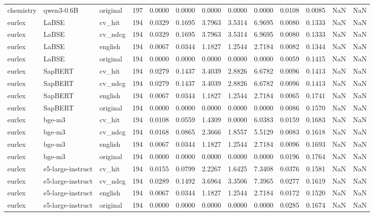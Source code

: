 \begin{tabular}{lllrrrrrrrrrr}
chemistry & qwen3-0.6B & original & 197 & 0.0000 & 0.0000 & 0.0000 & 0.0000 & 0.0000 & 0.0108 & 0.0085 & NaN & NaN \\
eurlex & LaBSE & cv\_hit & 194 & 0.0329 & 0.1695 & 3.7963 & 3.5314 & 6.9695 & 0.0080 & 0.1333 & NaN & NaN \\
eurlex & LaBSE & cv\_ndcg & 194 & 0.0329 & 0.1695 & 3.7963 & 3.5314 & 6.9695 & 0.0080 & 0.1333 & NaN & NaN \\
eurlex & LaBSE & english & 194 & 0.0067 & 0.0344 & 1.1827 & 1.2544 & 2.7184 & 0.0082 & 0.1344 & NaN & NaN \\
eurlex & LaBSE & original & 194 & 0.0000 & 0.0000 & 0.0000 & 0.0000 & 0.0000 & 0.0059 & 0.1415 & NaN & NaN \\
eurlex & SapBERT & cv\_hit & 194 & 0.0279 & 0.1437 & 3.4039 & 2.8826 & 6.6782 & 0.0096 & 0.1413 & NaN & NaN \\
eurlex & SapBERT & cv\_ndcg & 194 & 0.0279 & 0.1437 & 3.4039 & 2.8826 & 6.6782 & 0.0096 & 0.1413 & NaN & NaN \\
eurlex & SapBERT & english & 194 & 0.0067 & 0.0344 & 1.1827 & 1.2544 & 2.7184 & 0.0065 & 0.1741 & NaN & NaN \\
eurlex & SapBERT & original & 194 & 0.0000 & 0.0000 & 0.0000 & 0.0000 & 0.0000 & 0.0086 & 0.1570 & NaN & NaN \\
eurlex & bge-m3 & cv\_hit & 194 & 0.0108 & 0.0559 & 1.4309 & 0.0000 & 6.0383 & 0.0159 & 0.1683 & NaN & NaN \\
eurlex & bge-m3 & cv\_ndcg & 194 & 0.0168 & 0.0865 & 2.3666 & 1.8557 & 5.5129 & 0.0083 & 0.1618 & NaN & NaN \\
eurlex & bge-m3 & english & 194 & 0.0067 & 0.0344 & 1.1827 & 1.2544 & 2.7184 & 0.0096 & 0.1693 & NaN & NaN \\
eurlex & bge-m3 & original & 194 & 0.0000 & 0.0000 & 0.0000 & 0.0000 & 0.0000 & 0.0196 & 0.1764 & NaN & NaN \\
eurlex & e5-large-instruct & cv\_hit & 194 & 0.0155 & 0.0799 & 2.2267 & 1.6425 & 7.3408 & 0.0376 & 0.1581 & NaN & NaN \\
eurlex & e5-large-instruct & cv\_ndcg & 194 & 0.0289 & 0.1492 & 3.6964 & 3.3506 & 7.3965 & 0.0277 & 0.1619 & NaN & NaN \\
eurlex & e5-large-instruct & english & 194 & 0.0067 & 0.0344 & 1.1827 & 1.2544 & 2.7184 & 0.0172 & 0.1520 & NaN & NaN \\
eurlex & e5-large-instruct & original & 194 & 0.0000 & 0.0000 & 0.0000 & 0.0000 & 0.0000 & 0.0285 & 0.1674 & NaN & NaN \\

\end{tabular}
